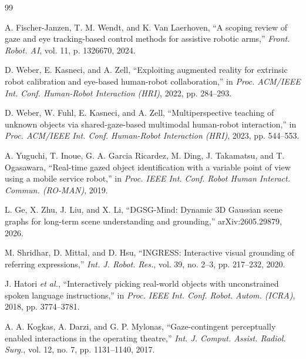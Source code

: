 \documentclass[letterpaper, 10 pt, conference]{ieeeconf}  %
\begin{document}
\begin{thebibliography}{99}



A. Fischer-Janzen, T. M. Wendt, and K. Van Laerhoven, ``A scoping
review of gaze and eye tracking-based control methods for assistive
robotic arms,'' \emph{Front. Robot. AI}, vol. 11, p. 1326670, 2024.

D. Weber, E. Kasneci, and A. Zell, ``Exploiting augmented reality for
extrinsic robot calibration and eye-based human-robot collaboration,''
in \emph{Proc. ACM/IEEE Int. Conf. Human-Robot Interaction (HRI)},
2022, pp. 284--293.

D. Weber, W. Fuhl, E. Kasneci, and A. Zell, ``Multiperspective
teaching of unknown objects via shared-gaze-based multimodal
human-robot interaction,'' in \emph{Proc. ACM/IEEE Int. Conf.
Human-Robot Interaction (HRI)}, 2023, pp. 544--553.

A. Yuguchi, T. Inoue, G. A. Garcia Ricardez, M. Ding, J. Takamatsu,
and T. Ogasawara, ``Real-time gazed object identification with a
variable point of view using a mobile service robot,'' in \emph{Proc.
IEEE Int. Conf. Robot Human Interact. Commun. (RO-MAN)}, 2019.

L. Ge, X. Zhu, J. Liu, and X. Li, ``DGSG-Mind: Dynamic 3D Gaussian
scene graphs for long-term scene understanding and grounding,''
arXiv:2605.29879, 2026.

M. Shridhar, D. Mittal, and D. Hsu, ``INGRESS: Interactive visual
grounding of referring expressions,'' \emph{Int. J. Robot. Res.},
vol. 39, no. 2--3, pp. 217--232, 2020.

J. Hatori \emph{et al.}, ``Interactively picking real-world objects
with unconstrained spoken language instructions,'' in \emph{Proc.
IEEE Int. Conf. Robot. Autom. (ICRA)}, 2018, pp. 3774--3781.

A. A. Kogkas, A. Darzi, and G. P. Mylonas, ``Gaze-contingent
perceptually enabled interactions in the operating theatre,''
\emph{Int. J. Comput. Assist. Radiol. Surg.}, vol. 12, no. 7,
pp. 1131--1140, 2017.


\end{thebibliography}
\end{document}
